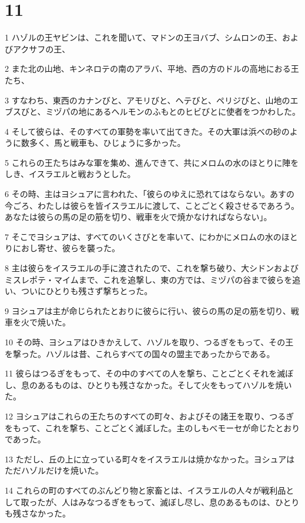 \chapter{11}

\par 1 ハゾルの王ヤビンは、これを聞いて、マドンの王ヨバブ、シムロンの王、およびアクサフの王、
\par 2 また北の山地、キンネロテの南のアラバ、平地、西の方のドルの高地におる王たち、
\par 3 すなわち、東西のカナンびと、アモリびと、ヘテびと、ペリジびと、山地のエブスびと、ミヅパの地にあるヘルモンのふもとのヒビびとに使者をつかわした。
\par 4 そして彼らは、そのすべての軍勢を率いて出てきた。その大軍は浜べの砂のように数多く、馬と戦車も、ひじょうに多かった。
\par 5 これらの王たちはみな軍を集め、進んできて、共にメロムの水のほとりに陣をしき、イスラエルと戦おうとした。
\par 6 その時、主はヨシュアに言われた、「彼らのゆえに恐れてはならない。あすの今ごろ、わたしは彼らを皆イスラエルに渡して、ことごとく殺させるであろう。あなたは彼らの馬の足の筋を切り、戦車を火で焼かなければならない」。
\par 7 そこでヨシュアは、すべてのいくさびとを率いて、にわかにメロムの水のほとりにおし寄せ、彼らを襲った。
\par 8 主は彼らをイスラエルの手に渡されたので、これを撃ち破り、大シドンおよびミスレポテ・マイムまで、これを追撃し、東の方では、ミヅパの谷まで彼らを追い、ついにひとりも残さず撃ちとった。
\par 9 ヨシュアは主が命じられたとおりに彼らに行い、彼らの馬の足の筋を切り、戦車を火で焼いた。
\par 10 その時、ヨシュアはひきかえして、ハゾルを取り、つるぎをもって、その王を撃った。ハゾルは昔、これらすべての国々の盟主であったからである。
\par 11 彼らはつるぎをもって、その中のすべての人を撃ち、ことごとくそれを滅ぼし、息のあるものは、ひとりも残さなかった。そして火をもってハゾルを焼いた。
\par 12 ヨシュアはこれらの王たちのすべての町々、およびその諸王を取り、つるぎをもって、これを撃ち、ことごとく滅ぼした。主のしもべモーセが命じたとおりであった。
\par 13 ただし、丘の上に立っている町々をイスラエルは焼かなかった。ヨシュアはただハゾルだけを焼いた。
\par 14 これらの町のすべてのぶんどり物と家畜とは、イスラエルの人々が戦利品として取ったが、人はみなつるぎをもって、滅ぼし尽し、息のあるものは、ひとりも残さなかった。
